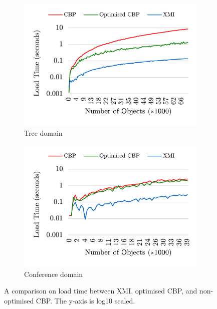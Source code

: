 \documentclass{llncs}
\begin{document}
\begin{figure}	
	\begin{subfigure}[t]{0.5\linewidth}
		\includegraphics[width=\linewidth]{loading_speed_tree}
		\caption{Tree domain}\label{fig:append_speed_tree}		
	\end{subfigure}
	\hfill
	\begin{subfigure}[t]{0.5\linewidth}
		\includegraphics[width=\linewidth]{loading_speed_conf}
		\caption{Conference domain}\label{fig:append_speed_conference}
	\end{subfigure}
	\caption{A comparison on load time between XMI, optimised CBP, and non-optimised CBP. The y-axis is log\textsc{10} scaled.}
	\label{fig:loading_speed}
\end{figure}
\end{document}
